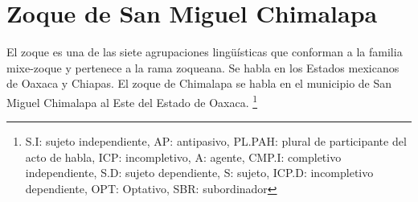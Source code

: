\section*{Zoque de San Miguel Chimalapa}

\noindent El zoque es una de las siete agrupaciones lingüísticas que conforman a la familia mixe-zoque y pertenece a la rama zoqueana. Se habla en los Estados mexicanos de Oaxaca y Chiapas. El zoque de Chimalapa se habla en el municipio de San Miguel Chimalapa al Este del Estado de Oaxaca.
\footnote{S.I: sujeto independiente, AP: antipasivo, PL.PAH: plural de participante del acto de habla, ICP: incompletivo, A: agente, CMP.I: completivo independiente, S.D: sujeto dependiente, S: sujeto, ICP.D: incompletivo dependiente, OPT: Optativo, SBR: subordinador}  \vspace{0.5cm}

